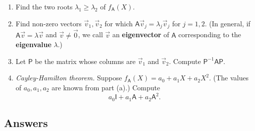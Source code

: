 \begin{enumerate}
\begin{enumerate}
\item Find the two roots $\lambda_1\geq\lambda_2$ of $f_{\mathsf{A}}(X)$.
\item Find non-zero vectors $\vec{v}_1,\vec{v}_2$ for which $\mathsf{A}\vec{v}_j = \lambda_j\vec{v}_j$ for $j = 1,2$. (In general, if $\mathsf{A}\vec{v} = \lambda\vec{v}$ and $\vec{v}\neq\vec{0}$, we call $\vec{v}$ an \textbf{eigenvector} of $\mathsf{A}$ corresponding to the \textbf{eigenvalue} $\lambda$.)
\item Let $\mathsf{P}$ be the matrix whose columns are $\vec{v}_1$ and $\vec{v}_2$. Compute $\mathsf{P}^{-1}\mathsf{AP}$.
\item \emph{Cayley-Hamilton theorem.} Suppose $f_{\mathsf{A}}(X) = a_0 + a_1X + a_2X^2$. (The values of $a_0, a_1, a_2$ are known from part (a).) Compute
\begin{equation*}
a_0\mathsf{I} + a_1\mathsf{A} + a_2\mathsf{A}^2.
\end{equation*}
\end{enumerate}
\end{enumerate}


\newpage
\subsection{Answers}

